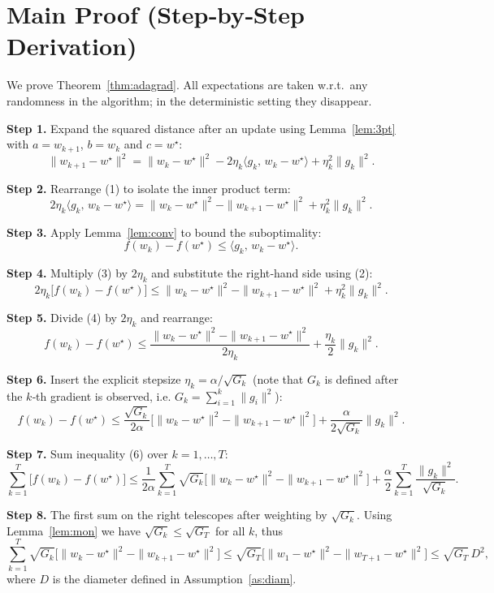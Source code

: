 \documentclass{article}
\begin{document}
\section*{Main Proof (Step‑by‑Step Derivation)}
We prove Theorem~\ref{thm:adagrad}. All expectations are taken w.r.t.\ any randomness in the algorithm; in the deterministic setting they disappear.

\noindent\textbf{Step 1.} Expand the squared distance after an update using Lemma~\ref{lem:3pt} with $a=w_{k+1}$, $b=w_{k}$ and $c=w^{\star}$:
\[
\|w_{k+1}-w^{\star}\|^{2}
 =\|w_{k}-w^{\star}\|^{2}
   -2\eta_{k}\langle g_{k},\,w_{k}-w^{\star}\rangle
   +\eta_{k}^{2}\|g_{k}\|^{2}.
\tag{1}
\]

\noindent\textbf{Step 2.} Rearrange (1) to isolate the inner product term:
\[
2\eta_{k}\langle g_{k},\,w_{k}-w^{\star}\rangle
 =\|w_{k}-w^{\star}\|^{2}
   -\|w_{k+1}-w^{\star}\|^{2}
   +\eta_{k}^{2}\|g_{k}\|^{2}.
\tag{2}
\]

\noindent\textbf{Step 3.} Apply Lemma~\ref{lem:conv} to bound the suboptimality:
\[
f(w_{k})-f(w^{\star})\le\langle g_{k},\,w_{k}-w^{\star}\rangle.
\tag{3}
\]

\noindent\textbf{Step 4.} Multiply (3) by $2\eta_{k}$ and substitute the right‑hand side using (2):
\[
2\eta_{k}\bigl[f(w_{k})-f(w^{\star})\bigr]
 \le
 \|w_{k}-w^{\star}\|^{2}
 -\|w_{k+1}-w^{\star}\|^{2}
 +\eta_{k}^{2}\|g_{k}\|^{2}.
\tag{4}
\]

\noindent\textbf{Step 5.} Divide (4) by $2\eta_{k}$ and rearrange:
\[
f(w_{k})-f(w^{\star})
 \le
 \frac{\|w_{k}-w^{\star}\|^{2}-\|w_{k+1}-w^{\star}\|^{2}}{2\eta_{k}}
 +\frac{\eta_{k}}{2}\|g_{k}\|^{2}.
\tag{5}
\]

\noindent\textbf{Step 6.} Insert the explicit stepsize $\eta_{k}= \alpha/\sqrt{G_{k}}$ (note that $G_{k}$ is defined after the $k$‑th gradient is observed, i.e. $G_{k}= \sum_{i=1}^{k}\|g_{i}\|^{2}$):
\[
f(w_{k})-f(w^{\star})
 \le
 \frac{\sqrt{G_{k}}}{2\alpha}
   \bigl[\|w_{k}-w^{\star}\|^{2}-\|w_{k+1}-w^{\star}\|^{2}\bigr]
 +\frac{\alpha}{2\sqrt{G_{k}}}\|g_{k}\|^{2}.
\tag{6}
\]

\noindent\textbf{Step 7.} Sum inequality (6) over $k=1,\dots,T$:
\[
\sum_{k=1}^{T}\bigl[f(w_{k})-f(w^{\star})\bigr]
 \le
 \frac{1}{2\alpha}
   \sum_{k=1}^{T}\sqrt{G_{k}}
   \bigl[\|w_{k}-w^{\star}\|^{2}-\|w_{k+1}-w^{\star}\|^{2}\bigr]
 +\frac{\alpha}{2}
   \sum_{k=1}^{T}\frac{\|g_{k}\|^{2}}{\sqrt{G_{k}}}.
\tag{7}
\]

\noindent\textbf{Step 8.} The first sum on the right telescopes after weighting by $\sqrt{G_{k}}$. Using Lemma~\ref{lem:mon} we have $\sqrt{G_{k}}\le\sqrt{G_{T}}$ for all $k$, thus
\[
\sum_{k=1}^{T}\sqrt{G_{k}}
   \bigl[\|w_{k}-w^{\star}\|^{2}-\|w_{k+1}-w^{\star}\|^{2}\bigr]
 \le
 \sqrt{G_{T}}\bigl[\|w_{1}-w^{\star}\|^{2}-\|w_{T+1}-w^{\star}\|^{2}\bigr]
 \le
 \sqrt{G_{T}}\,D^{2},
\tag{8}
\]
where $D$ is the diameter defined in Assumption~\ref{as:diam}.
\end{document}
